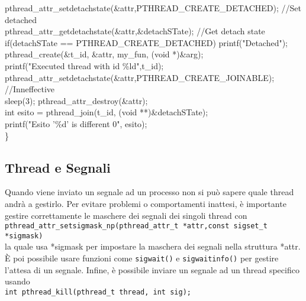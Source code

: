 \begin{flushleft}
\begin{flushleft}
{    \halftab pthread\_attr\_setdetachstate(\&attr,PTHREAD\_CREATE\_DETACHED); //Set detached\\
    \halftab pthread\_attr\_getdetachstate(\&attr,\&detachSTate); //Get detach state\\
    \halftab if(detachSTate == PTHREAD\_CREATE\_DETACHED) printf("Detached\n"); \\
    \halftab pthread\_create(\&t\_id, \&attr, my\_fun, (void *)\&arg);\\
    \halftab printf("Executed thread with id \%ld\n",t\_id);\\
    \halftab pthread\_attr\_setdetachstate(\&attr,PTHREAD\_CREATE\_JOINABLE); //Inneffective\\
    \halftab sleep(3); pthread\_attr\_destroy(\&attr);\\
    \halftab int esito = pthread\_join(t\_id, (void **)\&detachSTate); \\
    \halftab printf("Esito '\%d' is different 0\n", esito);\\
    \} }
  \end{flushleft}
  \subsection{Thread e Segnali}
  \begin{flushleft}
    Quando viene inviato un segnale ad un processo non si può sapere quale thread 
    andrà a gestirlo. Per evitare problemi o comportamenti inattesi, è importante gestire 
    correttamente le maschere dei segnali dei singoli thread con \\ 
    \texttt{pthread\_attr\_setsigmask\_np(pthread\_attr\_t *attr,const sigset\_t *sigmask)} \\
    la quale usa *sigmask per impostare la maschera dei segnali nella struttura *attr.\\
    È poi possibile usare funzioni come \texttt{sigwait()} e \texttt{sigwaitinfo()} per gestire 
    l’attesa di un segnale. Infine, è possibile inviare un segnale ad un thread specifico usando \\ 
    \texttt{int pthread\_kill(pthread\_t thread, int sig);}
  \end{flushleft}
\end{flushleft}
